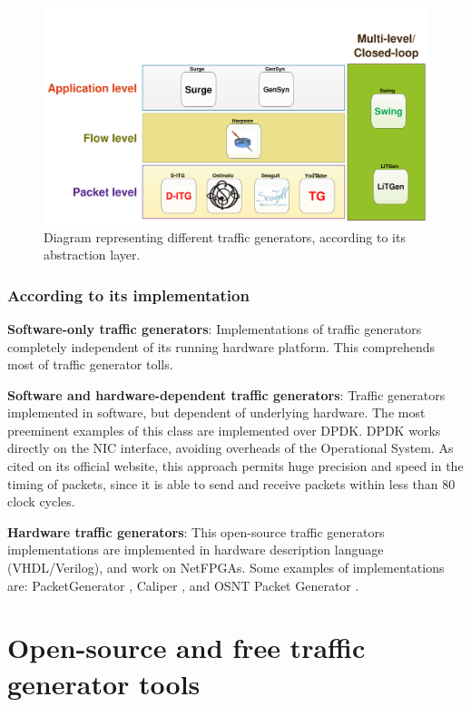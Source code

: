 \begin{figure}[!ht]
	\centering
	\includegraphics[scale=0.4]{figures/ch2/types-workload-tools}
	\caption{Diagram representing different traffic generators, according to its abstraction layer.}
	\label{fig:layers-workload-tools}
\end{figure}

\subsubsection{According to its implementation}

\textbf{Software-only traffic generators}: Implementations of traffic generators completely independent of its running hardware platform. This comprehends most of traffic generator tolls.

\textbf{Software and hardware-dependent traffic generators}: Traffic generators implemented in software, but dependent of underlying hardware. The most preeminent examples of this class are implemented over DPDK\cite{web-dpdk}. DPDK works directly on the NIC interface, avoiding overheads of the Operational System. As cited on its official website, this approach permits huge precision and speed in the timing of packets, since it is able to send and receive packets within less than 80 clock cycles.

\textbf{Hardware traffic generators}: This open-source traffic generators implementations are implemented in hardware description language (VHDL/Verilog), and work on NetFPGAs. Some examples of implementations are: PacketGenerator \cite{web-netfpgapacketgenerator}, Caliper \cite{web-caliper}, and OSNT Packet Generator \cite{web-osnt}.


\section{Open-source and free traffic generator tools}


